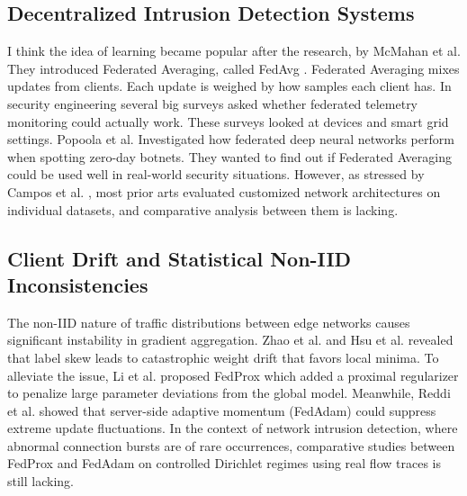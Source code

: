 \documentclass[runningheads]{llncs}
\begin{document}
\subsection{Decentralized Intrusion Detection Systems}
I think the idea of learning became popular after the research, by McMahan et al. They introduced Federated Averaging, called FedAvg \cite{mcmahan2017communication}. Federated Averaging mixes updates from clients. Each update is weighed by how samples each client has. In security engineering several big surveys \cite{campos2022evaluating,mothukuri2021federated} asked whether federated telemetry monitoring could actually work. These surveys looked at devices and smart grid settings. Popoola et al. \cite{popoola2021federated} Investigated how federated deep neural networks perform when spotting zero-day botnets. They wanted to find out if Federated Averaging could be used well in real-world security situations. However, as stressed by Campos et al. \cite{campos2022evaluating}, most prior arts evaluated customized network architectures on individual datasets, and comparative analysis between them is lacking.

\subsection{Client Drift and Statistical Non-IID Inconsistencies}
The non-IID nature of traffic distributions between edge networks causes significant instability in gradient aggregation. Zhao et al. \cite{zhao2018federated} and Hsu et al. \cite{hsu2019measuring} revealed that label skew leads to catastrophic weight drift that favors local minima. To alleviate the issue, Li et al. \cite{li2020federated} proposed FedProx which added a proximal regularizer to penalize large parameter deviations from the global model. Meanwhile, Reddi et al. \cite{reddi2020adaptive} showed that server-side adaptive momentum (FedAdam) could suppress extreme update fluctuations. In the context of network intrusion detection, where abnormal connection bursts are of rare occurrences, comparative studies between FedProx and FedAdam on controlled Dirichlet regimes using real flow traces is still lacking.
\end{document}
